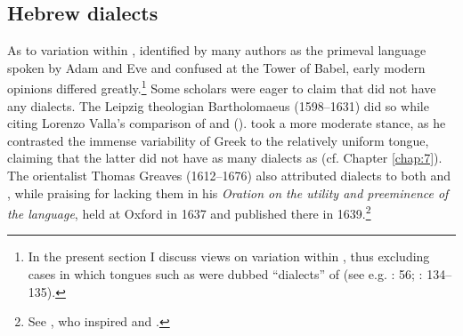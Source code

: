 \subsection{Hebrew dialects}

As to variation within , identified by many authors as the primeval language spoken by Adam and Eve and confused at the Tower of Babel, early modern opinions differed greatly.\footnote{In the present section I discuss views on variation within , thus excluding cases in which  tongues such as  were dubbed “dialects” of  (see e.g. \citealt{Bochart1646}: 56; \citealt{Martin1737}: 134–135).} Some scholars were eager to claim that  did not have any dialects. The Leipzig theologian Bartholomaeus (1598–1631) did so while citing Lorenzo Valla’s comparison of  and  (\citeyear[10]{Mayer1629}). \citet[\textsc{b.3}\textsc{\textsuperscript{v}}]{Junius1579} took a more moderate stance, as he contrasted the immense variability of Greek to the relatively uniform  tongue, claiming that the latter did not have as many dialects as  (cf. Chapter \ref{chap:7}). The  orientalist Thomas Greaves (1612–1676) also attributed dialects to both  and , while praising  for lacking them in his \textit{Oration on the utility and preeminence of the  language}, held at Oxford in 1637 and published there in 1639.\footnote{See \citet[19--20]{Greaves1639}, who inspired \citet[60]{Leigh1656} and \citet[73]{Blount1680}.}

